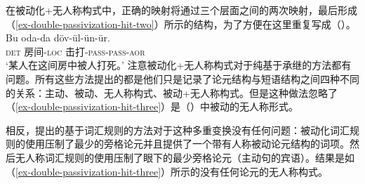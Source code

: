 \begin{exe}
\begin{xlist}[iv.]
\begin{exe}
\begin{xlist}[iv.]
\noindent
在被动化+无人称构式中，正确的映射将通过三个层面之间的两次映射，最后形成（\ref{ex-double-passivization-hit-two}）所示的结构，为了方便在这里重复写成（）。 
\ea
\label{ex-double-passivization-hit-three}
\gll Bu oda-da döv-ül-ün-ür.\\
     \textsc{det} 房间-\textsc{loc} 击打-\textsc{pass}-\textsc{pass}-\textsc{aor}\\
\glt `某人在这间房中被人打死。'
\z
注意被动化+无人称构式对于纯基于承继的方法都有问题。所有这些方法提出的都是他们只是记录了论元结构与短语结构之间四种不同的关系：主动、被动、无人称构式、被动+无人称构式。但是这种做法忽略了（\ref{ex-double-passivization-hit-three}）是（）中被动的无人称形式。

相反，\citet{Mueller2003e}提出的基于词汇规则的方法对于这种多重变换没有任何问题：被动化词汇规则的使用压制了最少的旁格论元并且提供了一个带有人称被动论元结构的词项。然后无人称词汇规则的使用压制了眼下的最少旁格论元（主动句的宾语）。结果是如（\ref{ex-double-passivization-hit-three}）所示的没有任何论元的无人称构式。


\end{xlist}
\end{exe}
\end{xlist}
\end{exe}
